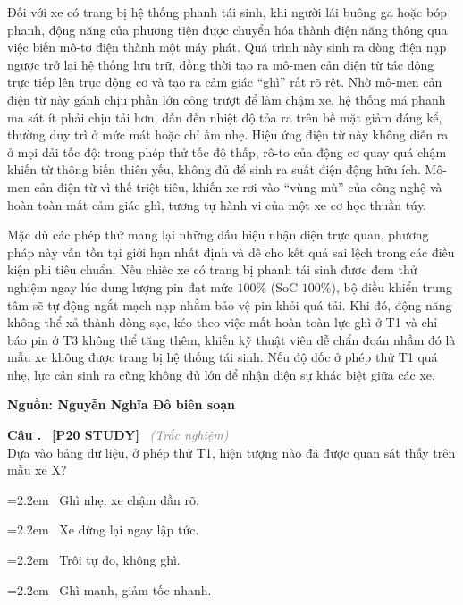\documentclass[12pt,a4paper,twoside]{article}
\newcounter{qcounter}
\newcommand{\question}[2][]{%
    \stepcounter{qcounter}%
    \par\vspace{5pt}%
    \noindent\textcolor{primaryBlue}{\textbf{Câu \theqcounter.}}~%
    \textcolor{secondaryBlue}{\small\textbf{[P20 STUDY]}}~%
    \if\relax\detokenize{#1}\relax\else\textcolor{gray}{\small\textit{(#1)}}~\fi\\[1pt]
    \noindent #2%
}
\newcommand{\choiceitem}[2]{%
    \tikz[baseline=-0.5ex]{
        \node[draw=primaryBlue, circle, minimum size=1.5em, inner sep=0pt, thick] {\textbf{#1}};
    }~#2%
}
\newenvironment{readingpassage}[1][]{%
    \begin{tcolorbox}[enhanced, colback=grayLight, colframe=secondaryBlue,
        coltitle=textDark, fonttitle=\bfseries, title={#1},
        rounded corners, arc=3mm, boxrule=1pt,
        left=15pt, right=15pt, top=10pt, bottom=10pt,
        breakable, before skip=10pt, after skip=10pt, drop fuzzy shadow]
    \setstretch{1.3}
}{\end{tcolorbox}}
\begin{document}
\begin{readingpassage}[]
\vspace{6pt}
Đối với xe có trang bị hệ thống phanh tái sinh, khi người lái buông ga hoặc bóp phanh, động năng của phương tiện được chuyển hóa thành điện năng thông qua việc biến mô-tơ điện thành một máy phát. Quá trình này sinh ra dòng điện nạp ngược trở lại hệ thống lưu trữ, đồng thời tạo ra mô-men cản điện từ tác động trực tiếp lên trục động cơ và tạo ra cảm giác ``ghì'' rất rõ rệt. Nhờ mô-men cản điện từ này gánh chịu phần lớn công trượt để làm chậm xe, hệ thống má phanh ma sát ít phải chịu tải hơn, dẫn đến nhiệt độ tỏa ra trên bề mặt giảm đáng kể, thường duy trì ở mức mát hoặc chỉ ấm nhẹ. Hiệu ứng điện từ này không diễn ra ở mọi dải tốc độ: trong phép thử tốc độ thấp, rô-to của động cơ quay quá chậm khiến từ thông biến thiên yếu, không đủ để sinh ra suất điện động hữu ích. Mô-men cản điện từ vì thế triệt tiêu, khiến xe rơi vào ``vùng mù'' của công nghệ và hoàn toàn mất cảm giác ghì, tương tự hành vi của một xe cơ học thuần túy.

Mặc dù các phép thử mang lại những dấu hiệu nhận diện trực quan, phương pháp này vẫn tồn tại giới hạn nhất định và dễ cho kết quả sai lệch trong các điều kiện phi tiêu chuẩn. Nếu chiếc xe có trang bị phanh tái sinh được đem thử nghiệm ngay lúc dung lượng pin đạt mức $100\%$ (SoC $100\%$), bộ điều khiển trung tâm sẽ tự động ngắt mạch nạp nhằm bảo vệ pin khỏi quá tải. Khi đó, động năng không thể xả thành dòng sạc, kéo theo việc mất hoàn toàn lực ghì ở T1 và chỉ báo pin ở T3 không thể tăng thêm, khiến kỹ thuật viên dễ chẩn đoán nhầm đó là mẫu xe không được trang bị hệ thống tái sinh. Nếu độ dốc ở phép thử T1 quá nhẹ, lực cản sinh ra cũng không đủ lớn để nhận diện sự khác biệt giữa các xe.

\hfill\textbf{Nguồn: Nguyễn Nghĩa Đô biên soạn}
\end{readingpassage}

\question[Trắc nghiệm]{Dựa vào bảng dữ liệu, ở phép thử T1, hiện tượng nào đã được quan sát thấy trên mẫu xe X?}
\par\vspace{4pt}
\noindent\hangindent=2.2em\choiceitem{A}{Ghì nhẹ, xe chậm dần rõ.}\par\vspace{4pt}
\noindent\hangindent=2.2em\choiceitem{B}{Xe dừng lại ngay lập tức.}\par\vspace{4pt}
\noindent\hangindent=2.2em\choiceitem{C}{Trôi tự do, không ghì.}\par\vspace{4pt}
\noindent\hangindent=2.2em\choiceitem{D}{Ghì mạnh, giảm tốc nhanh.}\par\vspace{4pt}
\end{document}
